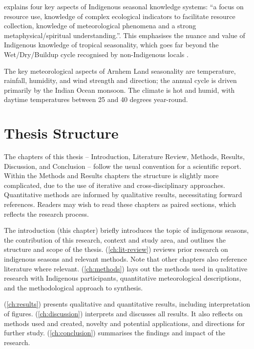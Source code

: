 \citet{woodward2012b} explains four key aspects of Indigenous seasonal
knowledge systems: ``a focus on resource use, knowledge of complex
ecological indicators to facilitate resource collection, knowledge of
meteorological phenomena and a strong metaphysical/spiritual understanding.''.
This emphasises the nuance and value of Indigenous knowledge of tropical
seasonality, which goes far beyond the Wet/Dry/Buildup cycle recognised
by non-Indigenous locals \citep{willmett2009}.

The key meteorological aspects of Arnhem Land seasonality are temperature,
rainfall, humidity, and wind strength and direction; the annual
cycle is driven primarily by the Indian Ocean monsoon.  The climate is hot and
humid, with daytime temperatures between 25 and 40 degrees year-round.



\section{Thesis Structure}

The chapters of this thesis -- Introduction, Literature Review, Methods,
Results, Discussion, and Conclusion -- follow the usual convention for
a scientific report.  Within the Methods and Results chapters
the structure is slightly more complicated, due to the use of iterative and
cross-disciplinary approaches.  Quantitative methods are informed by
qualitative results, necessitating forward references.  Readers may wish
to read these chapters as paired sections, which reflects the research
process.


The introduction (this chapter) briefly introduces the topic of
indigenous seasons, the contribution of this research, context and
study area, and outlines the structure and scope of the thesis.
%
 (\cref{ch:lit-review}) reviews prior research
on indigenous seasons and relevant methods.  Note that other chapters
also reference literature where relevant.
%
 (\cref{ch:methods}) lays out the methods used in
qualitative research with Indigenous participants, quantitative meteorological
descriptions, and the methodological approach to synthesis.

 (\cref{ch:results}) presents qualitative and
quantitative results, including interpretation of figures.
%
 (\cref{ch:discussion}) interprets and discusses
all results.  It also reflects on methods used and created, novelty and
potential applications, and directions for further study.
%
 (\cref{ch:conclusion}) summarises the findings
and impact of the research.

